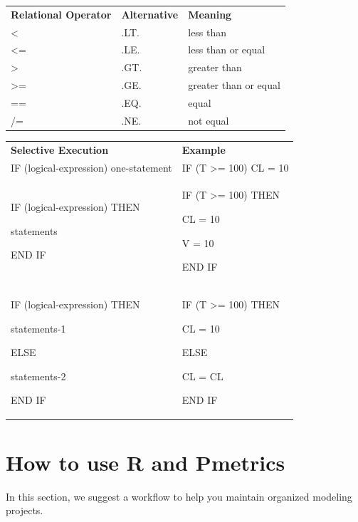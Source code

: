 \documentclass[
]{book}
\begin{document}
\begin{longtable}[]{@{}lll@{}}
\toprule
\endhead
\textbf{Relational Operator} & \textbf{Alternative} & \textbf{Meaning} \\
\textless{} & .LT. & less than \\
\textless= & .LE. & less than or equal \\
\textgreater{} & .GT. & greater than \\
\textgreater= & .GE. & greater than or equal \\
== & .EQ. & equal \\
/= & .NE. & not equal \\
\bottomrule
\end{longtable}

\begin{longtable}[]{@{}
  >{\raggedright\arraybackslash}p{}
  >{\raggedright\arraybackslash}p{}@{}}
\toprule
\endhead
\textbf{Selective Execution} & \textbf{Example} \\
IF (logical-expression) one-statement & IF (T \textgreater= 100) CL = 10 \\
IF (logical-expression) THEN

statements

END IF & IF (T \textgreater= 100) THEN

CL = 10

V = 10

END IF \\
IF (logical-expression) THEN

statements-1

ELSE

statements-2

END IF & IF (T \textgreater= 100) THEN

CL = 10

ELSE

CL = CL

END IF \\
\bottomrule
\end{longtable}

\hypertarget{how-to-use-r-and-pmetrics}{%
\chapter{How to use R and Pmetrics}\label{how-to-use-r-and-pmetrics}}

In this section, we suggest a workflow to help you maintain organized
modeling projects.
\end{document}
